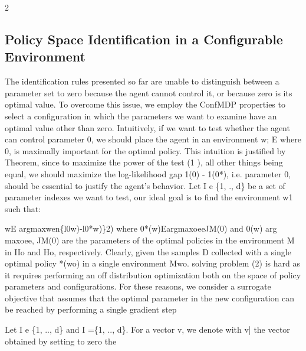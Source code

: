 \documentclass{article}
\begin{document}
\begin{paracol}{2}
\subsection*{Policy Space Identification in a Configurable
Environment}


The identification rules presented so far are unable to distinguish between a parameter set to zero because the agent
cannot control it, or because zero is its optimal value. To
overcome this issue, we employ the ConfMDP properties
to select a configuration in which the parameters we want to
examine have an optimal value other than zero. Intuitively, if
we want to test whether the agent can control parameter 0,
we should place the agent in an environment w; E  where
0, is maximally important for the optimal policy. This intuition is justified by Theorem, since to maximize the power
of the test (1  ), all other things being equal, we should
maximize the log-likelihood gap 1(0) - 1(0*), i.e. parameter 0, should be essential to justify the agent's behavior. Let
I e \{1, ., d\} be a set of parameter indexes we want to test,
our ideal goal is to find the environment w1 such that:


wE argmaxwen\{l0w)-l0*w)\}2)
where 0*(w)EargmaxoeeJM(0) and 0(w)
arg maxoee, JM(0) are the parameters of the optimal
policies in the environment M in IIo and Ho, respectively. Clearly, given the samples D collected with a single optimal policy *(wo) in a single environment Mwo.
solving problem (2) is hard as it requires performing an off
distribution optimization both on the space of policy parameters and configurations. For these reasons, we consider a
surrogate objective that assumes that the optimal parameter
in the new configuration can be reached by performing a single gradient step


Let I e \{1, .., d\} and I =\{1, .., d\}\I. For a vector v, we
denote with v| the vector obtained by setting to zero the

\end{paracol}
\end{document}
